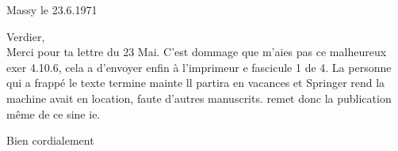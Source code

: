 \begin{flushright}
Massy le 23.6.1971\\
\end{flushright}
 Verdier,\\

Merci pour ta lettre du 23 Mai. C'est dommage que   m'aies pas  ce malheureux exer 4.10.6, cela a  d'envoyer enfin à l'imprimeur e fascicule 1 de  4. La personne qui a frappé le texte termine mainte ll partira en vacances et Springer rend la machine  avait en location, faute d'autres manuscrits.  remet donc la publication même de ce  sine ie.

Bien cordialement\\

